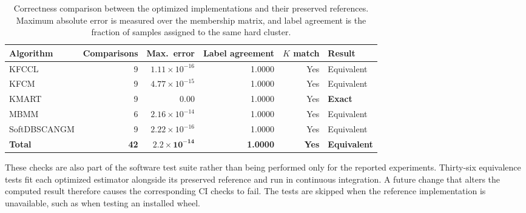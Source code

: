 \documentclass[twoside,11pt]{article}
\begin{document}
\begin{table}[h!]
\centering
\caption{Correctness comparison between the optimized implementations and
their preserved references. Maximum absolute error is measured over the
membership matrix, and label agreement is the fraction of samples assigned
to the same hard cluster.}
\label{tab:opt-correctness}
\small
\setlength{\tabcolsep}{5pt}
\renewcommand{\arraystretch}{1.15}
\begin{tabular}{lrrrrl}
\toprule
\textbf{Algorithm} &
\textbf{Comparisons} &
\textbf{Max.\ error} &
\textbf{Label agreement} &
\textbf{$K$ match} &
\textbf{Result} \\
\midrule

\rowcolor{gray!10}
KFCCL
& 9
& $1.11\times10^{-16}$
& 1.0000
& Yes
& Equivalent \\

KFCM
& 9
& $4.77\times10^{-15}$
& 1.0000
& Yes
& Equivalent \\

\rowcolor{gray!10}
KMART
& 9
& $\mathbf{0.00}$
& 1.0000
& Yes
& \textbf{Exact} \\

MBMM
& 6
& $2.16\times10^{-14}$
& 1.0000
& Yes
& Equivalent \\

\rowcolor{gray!10}
SoftDBSCANGM
& 9
& $2.22\times10^{-16}$
& 1.0000
& Yes
& Equivalent \\

\midrule

\textbf{Total}
& \textbf{42}
& $\mathbf{2.2\times10^{-14}}$
& \textbf{1.0000}
& \textbf{Yes}
& \textbf{Equivalent} \\

\bottomrule
\end{tabular}
\end{table}


These checks are also part of the software test suite rather than being
performed only for the reported experiments. Thirty-six equivalence tests
fit each optimized estimator alongside its preserved reference and run in
continuous integration. A future change that alters the computed result
therefore causes the corresponding CI checks to fail. The tests are skipped
when the reference implementation is unavailable, such as when testing an
installed wheel.
\end{document}
